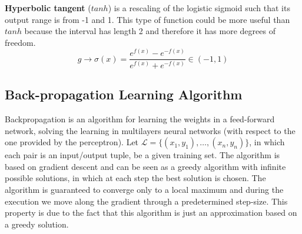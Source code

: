 \textbf{Hyperbolic tangent} ($tanh$) is a rescaling of the logistic sigmoid such that its output range is from -1 and 1. This type of function could be more useful than $tanh$ because the interval has length 2 and therefore it has more degrees of freedom.
$$g \rightarrow \sigma(x) = \frac{e^{f(x)} - e^{-f(x)}}{e^{f(x)} + e^ {-f(x)}} \in (-1, 1)$$



\subsection{Back-propagation Learning Algorithm}
Backpropagation is an algorithm for learning the weights in a feed-forward network, solving the learning in multilayers neural networks (with respect to the one provided by the perceptron). Let $\mathcal{L} = \{(x_1, y_1), \dots, (x_n,y_n) \}$, in which each pair is an input/output tuple, be a given training set. The algorithm is based on gradient descent and can be seen as a greedy algorithm with infinite possible solutions, in which at each step the best solution is chosen. The algorithm is guaranteed to converge only to a local maximum and during the execution we move along the gradient through a predetermined step-size. This property is due to the fact that this algorithm is just an approximation based on a greedy solution.


